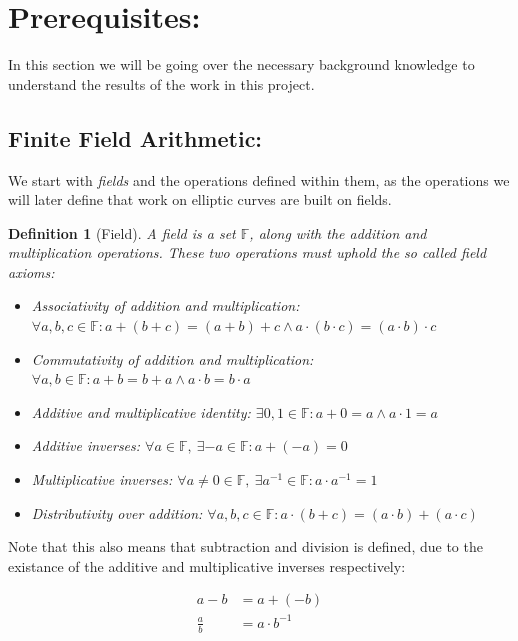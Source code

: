 \documentclass{article}
\newtheorem{definition}{Definition}[section]
\newcommand{\eq}[1]{\begin{equation*}\begin{split}#1\end{split}\end{equation*}}
\newcommand{\F}{\mathbb{F}}
\begin{document}
\section{Prerequisites:}

In this section we will be going over the necessary background knowledge
to understand the results of the work in this project.

\subsection{Finite Field Arithmetic:} \label{Finite Field Arithmetic}

We start with \textit{fields} and the operations defined within
them, as the operations we will later define that work on elliptic
curves are built on fields.

\begin{definition}[Field]
	A field is a set $\F$, along with the \textit{addition} and
	\textit{multiplication} operations. These two operations must
	uphold the so called \textit{field axioms}:

	\begin{itemize}
		\item Associativity of addition and multiplication:
		$\forall a,b,c \in \F : a + (b + c) = (a + b) + c \land a \cdot (b \cdot c) = (a \cdot b) \cdot c$
		\item Commutativity of addition and multiplication:
		$\forall a,b \in \F : a+b=b+a \land a \cdot b = b \cdot a$
		\item Additive and multiplicative identity:
		$\exists 0,1 \in \F : a + 0 = a \land a \cdot 1 = a$
		\item Additive inverses:
		$\forall a \in \F,\ \exists {-a} \in \F : a + ({-a}) = 0$
		\item Multiplicative inverses:
		$\forall a \neq 0 \in \F,\  \exists a^{-1} \in \F : a \cdot a^{-1} = 1$
		\item Distributivity over addition:
		$\forall a,b,c \in \F : a \cdot (b + c) = (a \cdot b) + (a \cdot c)$
	\end{itemize}
\end{definition}

Note that this also means that subtraction and division is defined,
due to the existance of the additive and multiplicative inverses
respectively:

\eq{
	a-b         &= a + (-b) \\
	\frac{a}{b} &= a \cdot b^{-1}
}
\end{document}

